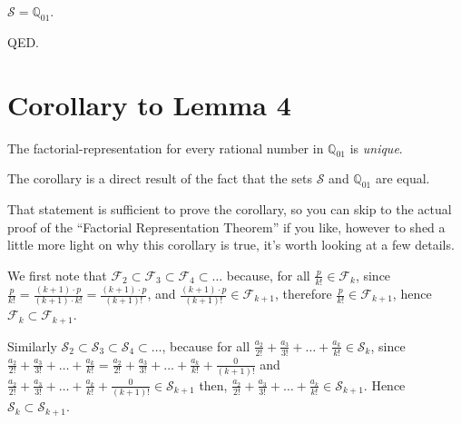 \documentclass{article}
\begin{document}
\begin{center}
\(\mathcal{S} = \mathbb{Q}_{01}\).
\end{center}

QED.

\section*{Corollary to Lemma 4}

The factorial-representation for every rational number in \(\mathbb{Q}_{01}\) is \emph{unique}.

The corollary is a direct result of the fact that
the sets \(\mathcal{S}\) and \(\mathbb{Q}_{01}\) are equal.

That statement is sufficient to prove the corollary, so you can skip to
the actual proof of the ``Factorial Representation Theorem'' if you like, however
to shed a little more light on why this corollary is true, it's worth looking at a few details.

We first note that
\(\mathcal{F}_2
\subset \mathcal{F}_3
\subset \mathcal{F}_4
\subset \dots{}\) because,
for all \(\frac{p}{k!} \in \mathcal{F}_k\),
since \(\frac{p}{k!} = \frac{(k+1)\cdot{}p}{(k+1)\cdot{}k!} = \frac{(k+1)\cdot{}p}{(k+1)!}\),
and \(\frac{(k+1)\cdot{}p}{(k+1)!} \in \mathcal{F}_{k+1}\),
therefore \(\frac{p}{k!} \in \mathcal{F}_{k+1}\),
hence \(\mathcal{F}_k \subset \mathcal{F}_{k+1}\).



Similarly
\(\mathcal{S}_2
\subset \mathcal{S}_3
\subset \mathcal{S}_4
\subset \dots{}\), because
for all \(\frac{a_2}{2!}\!+\!\frac{a_3}{3!}\!+\!\dots{}\!+\!\frac{a_k}{k!} \in \mathcal{S}_k\),
since\newline
\(\frac{a_2}{2!}\!+\!\frac{a_3}{3!}\!+\!\dots{}\!+\!\frac{a_k}{k!} =
\frac{a_2}{2!}\!+\!\frac{a_3}{3!}\!+\!\dots{}\!+\!\frac{a_k}{k!}\!+\!\frac{0}{(k+1)!}\)
and
\(\frac{a_2}{2!}\!+\!\frac{a_3}{3!}\!+\!\dots{}\!+\!\frac{a_k}{k!}\!+\!\frac{0}{(k+1)!}
\in \mathcal{S}_{k+1}\) then,\newline
\(\frac{a_2}{2!}\!+\!\frac{a_3}{3!}\!+\!\dots{}\!+\!\frac{a_k}{k!}
\in \mathcal{S}_{k+1}\). Hence 
\(\mathcal{S}_k \subset \mathcal{S}_{k+1}\).
\end{document}
